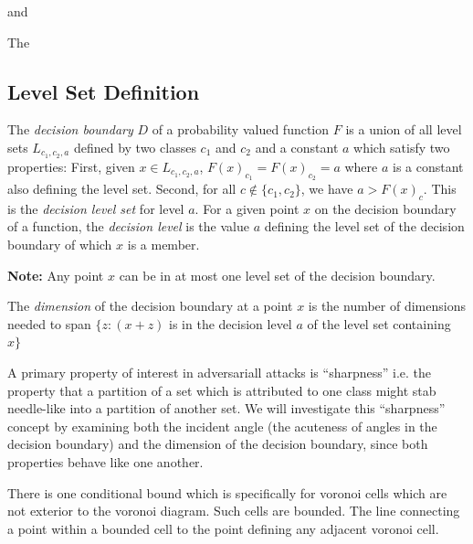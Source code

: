 and
\begin{definition}
The 
\end{definition}

\subsection{Level Set Definition}
\begin{definition}
The \emph{decision boundary} $D$ of a probability valued function $F$
is a union of all level sets $L_{c_1, c_2, a}$ defined by two classes
$c_1$ and $c_2$ and a constant $a$ which satisfy two properties:
First, given $x \in L_{c_1, c_2, a}$, $F(x)_{c_1} = F(x)_{c_2} = a$
where $a$ is a constant also defining the level set. Second, for all
$c \notin \{c_1, c_2\}$, we have $a > F(x)_c$. This is the
\emph{decision level set} for level $a$. For a given point $x$ on the
decision boundary of a function, the \emph{decision level} is the
value $a$ defining the level set of the decision boundary of which $x$
is a member.

\textbf{Note: } Any point $x$ can be in at most one level set of the
decision boundary. 

\end{definition}

\begin{definition}
  The \emph{dimension} of the decision boundary at a point $x$ is the
  number of dimensions needed to span $\{z : (x + z)$ is in the decision
    level $a$ of the level set containing $x\}$
\end{definition}

A primary property of interest in adversariall attacks is
``sharpness'' i.e. the property that a partition of a set which is
attributed to one class might stab needle-like into a partition of
another set. We will investigate this ``sharpness'' concept by
examining both the incident angle (the acuteness of angles in the
decision boundary) and the dimension of the decision boundary, since
both properties behave like one another. 

There is one conditional bound which is specifically for
voronoi cells which are not exterior to the voronoi diagram. Such
cells are bounded. The line connecting a point within a bounded cell
to the point defining any adjacent voronoi cell.

